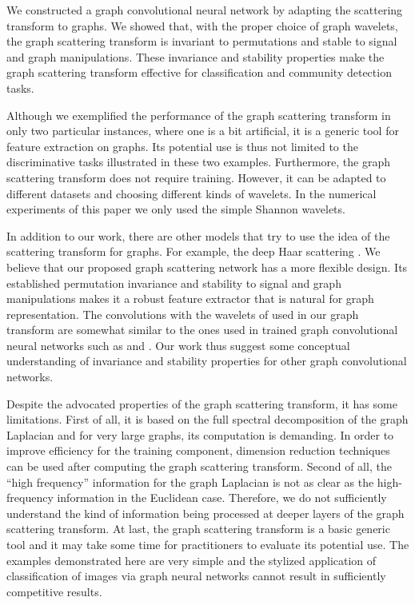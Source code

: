 \documentclass{article}
\begin{document}
{We constructed a graph convolutional neural network by adapting the scattering transform to graphs. We showed that, with the proper choice of graph wavelets, the graph scattering transform is invariant to permutations and stable to signal and graph manipulations. These invariance and stability properties make the graph scattering transform effective for classification and community detection tasks.}

{Although we exemplified the performance of the graph scattering transform in only two particular instances, where one is a bit artificial, it is a generic tool for feature extraction on graphs. Its potential use is thus not limited to the discriminative tasks illustrated in these two examples. Furthermore, the graph scattering transform does not require training. However, it can be adapted to different datasets and choosing  different kinds of wavelets. In the numerical experiments of this paper we only used the simple Shannon wavelets.}

{In addition to our work, there are other models that try to use the idea of the scattering transform for graphs. For example, the deep Haar scattering \cite{CheCM14}. We believe that our proposed graph scattering network has a more flexible design. Its established  permutation invariance and stability to signal and graph manipulations makes it a robust feature extractor that is natural for graph representation.
The convolutions with the wavelets of \cite{HamVG11} used in our graph transform are somewhat similar to the ones used in trained graph convolutional neural networks such as \cite{DefBV16} and \cite{KipW16}. Our work thus suggest some conceptual understanding of invariance and stability properties for other graph convolutional networks.}

{Despite the advocated properties of the graph scattering transform, it has some limitations. First of all, it is based on the full spectral decomposition of the graph Laplacian and for very large graphs, its computation is demanding.
In order to improve efficiency for the training component, dimension reduction techniques can be used after computing  the graph scattering transform. Second of all, the ``high frequency'' information for the graph Laplacian is not as clear as the high-frequency information in the Euclidean case. Therefore, we do not sufficiently understand the kind of information being processed at deeper layers of the graph scattering transform. At last, the graph scattering transform is a basic generic tool and it may take some time for practitioners to evaluate its potential use. The examples demonstrated here are very simple and the stylized application of classification of images via graph neural networks cannot result in sufficiently competitive results.}
\end{document}
